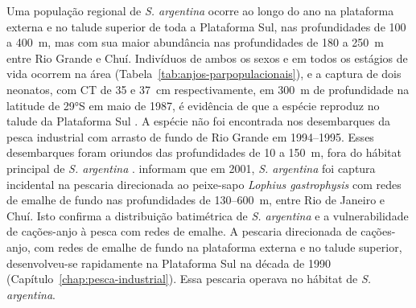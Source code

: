 \documentclass[a4paper,11pt,twoside,showtrims,onecolumn,openright,final]{memoir}
\begin{document}
Uma população regional de \emph{S. argentina} ocorre ao longo do ano na plataforma externa e no talude 
superior de toda a Plataforma Sul, nas profundidades de 100 a 400~m, mas com sua maior abundância 
nas profundidades de 180 a 250~m entre Rio Grande e Chuí. Indivíduos de ambos os sexos e em todos 
os estágios de vida ocorrem na área (Tabela~\ref{tab:anjos-parpopulacionais}), %
e a captura de dois neonatos, com CT de 35 e 37~cm 
respectivamente, em 300~m de profundidade na latitude de 29°S em maio de 1987, é evidência de que 
a espécie reproduz no talude da Plataforma Sul \citep[dados pretéritos FURG]{silva1996,vooren1997}. %
A espécie não foi encontrada nos desembarques da pesca industrial com arrasto de fundo de Rio Grande 
em 1994--1995. Esses desembarques foram oriundos das profundidades de 10 a 150~m, fora do hábitat principal 
de \emph{S. argentina} \citep{vieira1996}. %
\citet{perez2005} informam que em 2001, \emph{S. argentina} foi captura 
incidental na pescaria direcionada ao peixe-sapo \emph{Lophius gastrophysis} com redes de emalhe de fundo nas 
profundidades de 130--600~m, entre Rio de Janeiro e Chuí. Isto confirma a distribuição batimétrica 
de \emph{S. argentina} e a vulnerabilidade de cações-anjo à pesca com redes de emalhe. A pescaria direcionada 
de cações-anjo, com redes de emalhe de fundo na plataforma externa e no talude superior, desenvolveu-se 
rapidamente na Plataforma Sul na década de 1990 (Capítulo~\ref{chap:pesca-industrial}). 
Essa pescaria operava no hábitat de \emph{S. argentina}. 
\end{document}
